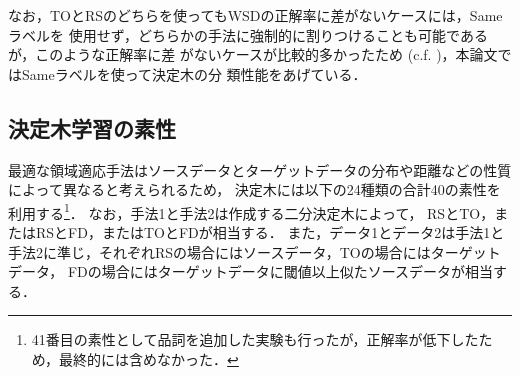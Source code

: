 \documentclass[japanese]{jnlp_1.4}
\newcommand{\tabref}[1]{}
\begin{document}
なお，TOとRSのどちらを使ってもWSDの正解率に差がないケースには，Sameラベルを
使用せず，どちらかの手法に強制的に割りつけることも可能であるが，このような正解率に差
がないケースが比較的多かったため (c.f. \tabref{決定木とラベル付け手法別に見たラベルの分布})，本論文ではSameラベルを使って決定木の分
類性能をあげている．



\subsection{決定木学習の素性}

最適な領域適応手法はソースデータとターゲットデータの分布や距離などの性質によって異なると考えられるため，
決定木には以下の24種類の合計40の素性を利用する\footnote{
	41番目の素性として品詞を追加した実験も行ったが，正解率が低下したため，最終的には含めなかった．}．
なお，手法1と手法2は作成する二分決定木によって，
RSとTO，またはRSとFD，またはTOとFDが相当する．
また，データ1とデータ2は手法1と手法2に準じ，それぞれRSの場合にはソースデータ，TOの場合にはターゲットデータ，
FDの場合にはターゲットデータに閾値以上似たソースデータが相当する．
\end{document}
